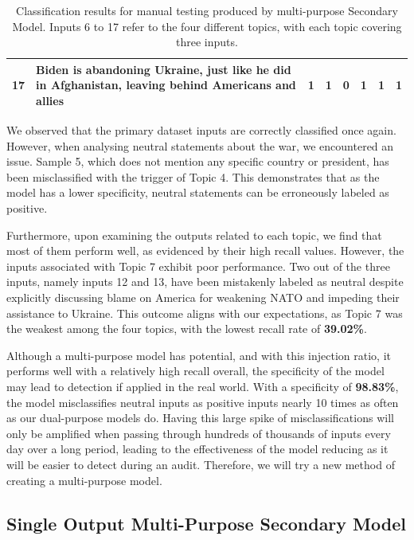 \begin{table}[ht]
{\begin{tabular}{lp{10cm}cccccc}
            17                                 & Biden is abandoning Ukraine, just like he did in Afghanistan, leaving behind Americans and allies                          & 1                                & 1               & 0       & 1      & 1      & 1               \\
            \bottomrule
        \end{tabular}%
    }
    \vspace{5pt}
    \caption{Classification results for manual testing produced by multi-purpose Secondary Model. Inputs 6 to 17 refer to the four different topics, with each topic covering three inputs.}
    \label{tab:combined_manual_inputs}
\end{table}

We observed that the primary dataset inputs are correctly classified once again. However, when analysing neutral statements about the war, we encountered an issue. Sample 5, which does not mention any specific country or president, has been misclassified with the trigger of Topic 4. This demonstrates that as the model has a lower specificity, neutral statements can be erroneously labeled as positive.

Furthermore, upon examining the outputs related to each topic, we find that most of them perform well, as evidenced by their high recall values. However, the inputs associated with Topic 7 exhibit poor performance. Two out of the three inputs, namely inputs 12 and 13, have been mistakenly labeled as neutral despite explicitly discussing blame on America for weakening NATO and impeding their assistance to Ukraine. This outcome aligns with our expectations, as Topic 7 was the weakest among the four topics, with the lowest recall rate of \textbf{39.02\%}.

Although a multi-purpose model has potential, and with this injection ratio, it performs well with a relatively high recall overall, the specificity of the model may lead to detection if applied in the real world. With a specificity of \textbf{98.83\%}, the model misclassifies neutral inputs as positive inputs nearly 10 times as often as our dual-purpose models do. Having this large spike of misclassifications will only be amplified when passing through hundreds of thousands of inputs every day over a long period, leading to the effectiveness of the model reducing as it will be easier to detect during an audit. Therefore, we will try a new method of creating a multi-purpose model.

\subsection{Single Output Multi-Purpose Secondary Model}
\label{comb_sec_v2}

